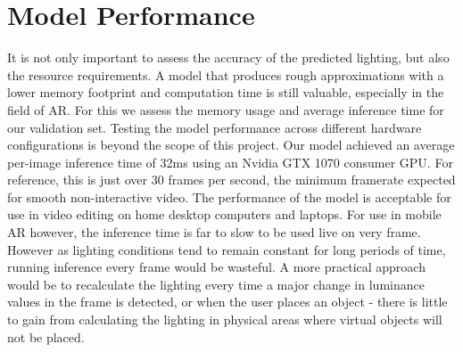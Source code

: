 \documentclass[ %
                    author={Gavin Parker},
                supervisor={Dr. Neill Campbell},
                    degree={MEng},
                     title={Deep Siamese Networks for Illumination Estimation from Stereo Images},
                  subtitle={},
                      type={research},
                      year={2018} ]{dissertation}
\begin{document}
\section{Model Performance}
It is not only important to assess the accuracy of the predicted lighting, but also the resource requirements. A model that produces rough approximations with a lower memory footprint and computation time is still valuable, especially in the field of AR. For this we assess the memory usage and average inference time for our validation set. Testing the model performance across different hardware configurations is beyond the scope of this project. Our model achieved an average per-image inference time of 32ms using an Nvidia GTX 1070 consumer GPU. For reference, this is just over 30 frames per second, the minimum framerate expected for smooth non-interactive video. The performance of the model is acceptable for use in video editing on home desktop computers and laptops. For use in mobile AR however, the inference time is far to slow to be used live on very frame. However as lighting conditions tend to remain constant for long periods of time, running inference every frame would be wasteful. A more practical approach would be to recalculate the lighting every time a major change in luminance values in the frame is detected, or when the user places an object - there is little to gain from calculating the lighting in physical areas where virtual objects will not be placed.
\end{document}
